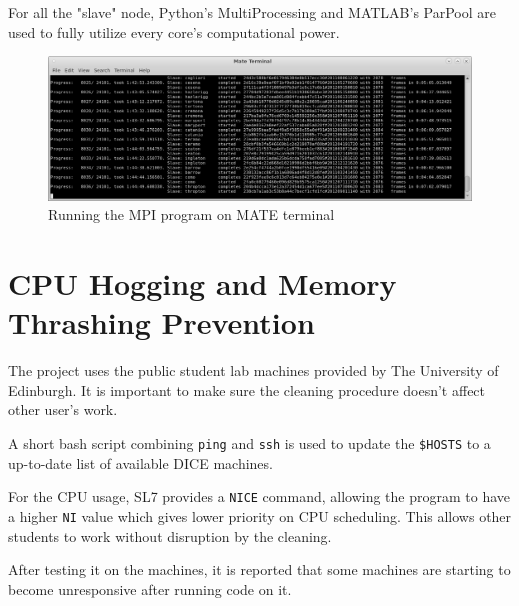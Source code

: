 \documentclass[bsc,logo,twoside,fullspacing,parskip]{infthesis}
\begin{document}

For all the "slave" node, Python's MultiProcessing and MATLAB's ParPool are used to fully utilize every core's computational power.

\begin{figure}
    \centering
    \includegraphics[scale=0.30]{graph/sample_terminal.png}
    \caption{Running the MPI program on MATE terminal}
    \label{fig:mpi}
\end{figure}

\section{CPU Hogging and Memory Thrashing Prevention}

The project uses the public student lab machines provided by The University of Edinburgh. 
It is important to make sure the cleaning procedure doesn't affect other user's work.

A short bash script combining {\tt ping} and {\tt ssh} is used to update the {\tt \$HOSTS} to a up-to-date list of available DICE machines.

For the CPU usage, SL7 provides a {\tt NICE} command, allowing the program to have a higher {\tt NI} value which gives lower priority on CPU scheduling. This allows other students to work without disruption by the cleaning.

After testing it on the machines, it is reported that some machines are starting to become unresponsive after running code on it.
\end{document}
